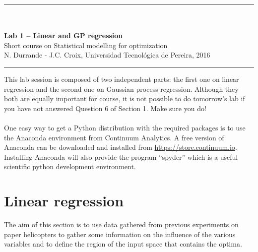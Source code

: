 \documentclass[12pt]{scrartcl}
\begin{document}
\begin{center}
	\rule{\textwidth}{1pt}
	\\ \ \\
	{\LARGE \textbf{Lab 1 -- Linear and GP regression}}\\ 
	\vspace{3mm}
	{\large Short course on Statistical modelling for optimization\\ \vspace{3mm}}
	{\normalsize N. Durrande - J.C. Croix, Universidad Tecnol\'ogica de Pereira, 2016}\\ 
	\vspace{3mm}
	\rule{\textwidth}{1pt}
	\vspace{5mm}
\end{center}
This lab session is composed of two independent parts: the first one on linear regression and the second one on Gaussian process regression. Although they both are equally important for course, it is not possible to do tomorrow's lab if you have not answered Question 6 of Section 1. Make sure you do!

\paragraph{}
\noindent One easy way to get a Python distribution with the required packages is to use the Anaconda environment from Continuum Analytics.
A free version of Anaconda can be downloaded and installed from  \url{https://store.continuum.io}. Installing Anaconda will also provide the program ``spyder'' which is a useful scientific python development environment.

\section{Linear regression}
The aim of this section is to use data gathered from previous experiments on paper helicopters to gather some information on the influence of the various variables and to define the region of the input space that contains the optima.

\end{document}
